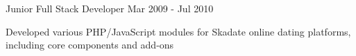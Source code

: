 \begin{cventries}
  \cventry
    {Junior Full Stack Developer} %
    {} %
    {} %
    {Mar 2009 - Jul 2010} %
    {
      \begin{cvitems}
        \item Developed various PHP/JavaScript modules for Skadate online dating platforms, including core components and add-ons
      \end{cvitems}
    }

\end{cventries}
